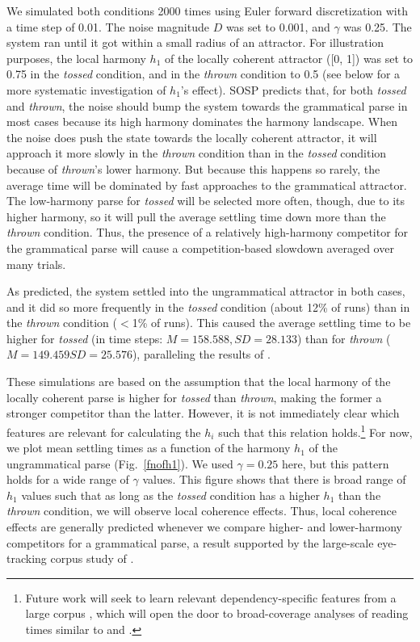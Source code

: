 \documentclass[10pt,letterpaper]{article}
\begin{document}
We simulated both conditions 2000 times using Euler forward discretization with a time step of 0.01. The noise magnitude $D$ was set to 0.001, and $\gamma$ was 0.25. The system ran until it got within a small radius of an attractor. For illustration purposes, the local harmony $h_1$ of the locally coherent attractor ([0, 1]) was set to 0.75 in the \emph{tossed} condition, and in the \emph{thrown} condition to 0.5 (see below for a more systematic investigation of $h_1$'s effect). %
SOSP predicts that, for both \emph{tossed} and \emph{thrown}, the noise should bump the system towards the grammatical parse in most cases because its high harmony dominates the harmony landscape. When the noise does push the state towards the locally coherent attractor, it will approach it more slowly in the \emph{thrown} condition than in the \emph{tossed} condition because of \emph{thrown}'s lower harmony. But because this happens so rarely, the average time will be dominated by fast approaches to the grammatical attractor. The low-harmony parse for \emph{tossed} will be selected more often, though, due to its higher harmony, so it will pull the average settling time down more than the \emph{thrown} condition. Thus, the presence of a relatively high-harmony competitor for the grammatical parse will cause a competition-based slowdown averaged over many trials.

As predicted, the system settled into the ungrammatical attractor in both cases, and it did so more frequently in the \emph{tossed} condition (about 12\% of runs) than in the \emph{thrown} condition ($<$1\% of runs). This caused the average settling time to be higher for \emph{tossed} (in time steps: $M = 158.588, SD = 28.133$) than for \emph{thrown} ($M = 149.459 SD = 25.576$), paralleling the results of .

These simulations are based on the assumption that the local harmony of the locally coherent parse is higher for \emph{tossed} than \emph{thrown}, making the former a stronger competitor than the latter. However, it is not immediately clear which features are relevant for calculating the $h_i$ such that this relation holds.\footnote{Future work will seek to learn relevant dependency-specific features from a large corpus \cite{zhao2014learning, bansal2015dependency}, which will open the door to broad-coverage analyses of reading times similar to  and .} For now, we plot mean settling times as a function of the harmony $h_1$ of the ungrammatical parse (Fig.~\ref{fnofh1}). We used $\gamma = 0.25$ here, but this pattern holds for a wide range of $\gamma$ values. This figure shows that there is broad range of $h_1$ values such that as long as the \emph{tossed} condition has a higher $h_1$ than the \emph{thrown} condition, we will observe local coherence effects. Thus, local coherence effects are generally predicted whenever we compare higher- and lower-harmony competitors for a grammatical parse, a result supported by the large-scale eye-tracking corpus study of .
\end{document}
